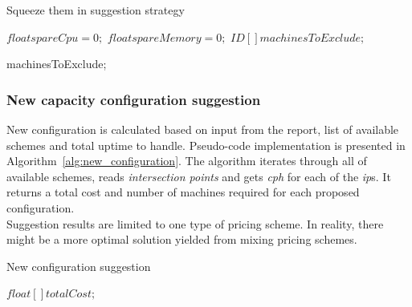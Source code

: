 \documentclass[]{final_report}
\begin{document}
\begin{algorithm}[h]
\caption{Squeeze them in suggestion strategy}
\label{alg:squeeze-them-in}
 \algrenewcommand{}
 \algrenewcommand{}
 \begin{algorithmic}[1]
  $float spareCpu = 0;$
  $float spareMemory = 0;$
  $ID[ ] machinesToExclude;$



\Return machinesToExclude;
\end{algorithmic}
\end{algorithm}

\subsubsection{New capacity configuration suggestion}

New configuration is calculated based on input from the report, list of available schemes and total uptime to handle. Pseudo-code implementation is presented in Algorithm~\ref{alg:new_configuration}. The algorithm iterates through all of available schemes, reads \textit{intersection points} and gets \textit{cph} for each of the \textit{ip}s. It returns a total cost and number of machines required for each proposed configuration. \\
Suggestion results are limited to one type of pricing scheme. In reality, there might be a more optimal solution yielded from mixing pricing schemes. 

\begin{algorithm}[h]
\caption{New configuration suggestion}
\label{alg:new_configuration}
 \algrenewcommand{}
 \algrenewcommand{}

  $float[ ] totalCost;$


\end{algorithm}
\end{document}
